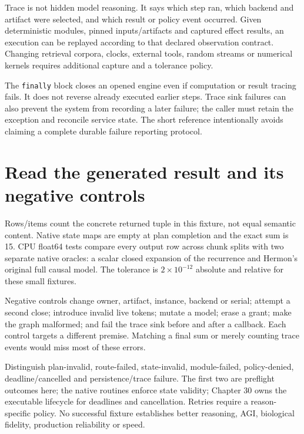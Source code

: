 Trace is not hidden model reasoning. It says which step ran, which backend
and artifact were selected, and which result or policy event occurred.
Given deterministic modules, pinned inputs/artifacts and captured effect
results, an execution can be replayed according to that declared observation
contract. Changing retrieval corpora, clocks, external tools, random streams
or numerical kernels requires additional capture and a tolerance policy.

The \texttt{finally} block closes an opened engine even if computation or
result tracing fails. It does not reverse already executed earlier steps.
Trace sink failures can also prevent the system from recording a later
failure; the caller must retain the exception and reconcile service state.
The short reference intentionally avoids claiming a complete durable failure
reporting protocol.

\section{Read the generated result and its negative controls}
\label{evod39:evidence}
\begin{center}\end{center}
Rows/items count the concrete returned tuple in this fixture, not equal
semantic content. Native state maps are empty at plan completion and the
exact sum is 15. CPU float64 tests compare every output row across chunk
splits with two separate native oracles: a scalar closed expansion of the
recurrence and Hermon's original full causal model. The tolerance is
$2\times10^{-12}$ absolute and relative for these small fixtures.

Negative controls change owner, artifact, instance, backend or serial;
attempt a second close; introduce invalid live tokens; mutate a model;
erase a grant; make the graph malformed; and fail the trace sink before and
after a callback. Each control targets a different premise. Matching a final
sum or merely counting trace events would miss most of these errors.

Distinguish plan-invalid, route-failed, state-invalid, module-failed,
policy-denied, deadline/cancelled and persistence/trace failure. The first two
are preflight outcomes here; the native routines enforce state validity;
Chapter 30 owns the executable lifecycle for deadlines and cancellation.
Retries require a reason-specific policy. No successful fixture establishes
better reasoning, AGI, biological fidelity, production reliability or speed.

